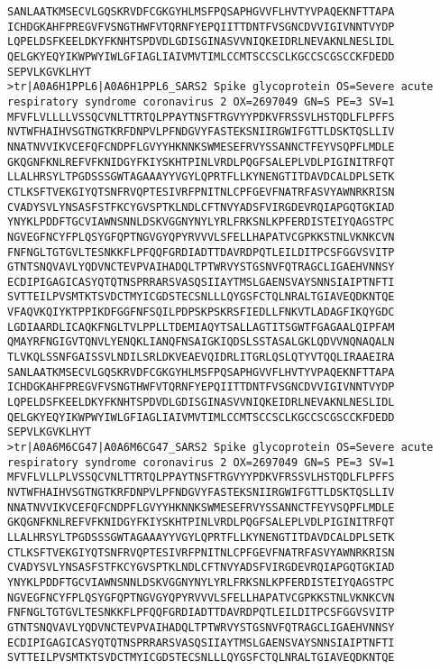 \begin{lstlisting}
SANLAATKMSECVLGQSKRVDFCGKGYHLMSFPQSAPHGVVFLHVTYVPAQEKNFTTAPA
ICHDGKAHFPREGVFVSNGTHWFVTQRNFYEPQIITTDNTFVSGNCDVVIGIVNNTVYDP
LQPELDSFKEELDKYFKNHTSPDVDLGDISGINASVVNIQKEIDRLNEVAKNLNESLIDL
QELGKYEQYIKWPWYIWLGFIAGLIAIVMVTIMLCCMTSCCSCLKGCCSCGSCCKFDEDD
SEPVLKGVKLHYT
>tr|A0A6H1PPL6|A0A6H1PPL6_SARS2 Spike glycoprotein OS=Severe acute respiratory syndrome coronavirus 2 OX=2697049 GN=S PE=3 SV=1
MFVFLVLLLLVSSQCVNLTTRTQLPPAYTNSFTRGVYYPDKVFRSSVLHSTQDLFLPFFS
NVTWFHAIHVSGTNGTKRFDNPVLPFNDGVYFASTEKSNIIRGWIFGTTLDSKTQSLLIV
NNATNVVIKVCEFQFCNDPFLGVYYHKNNKSWMESEFRVYSSANNCTFEYVSQPFLMDLE
GKQGNFKNLREFVFKNIDGYFKIYSKHTPINLVRDLPQGFSALEPLVDLPIGINITRFQT
LLALHRSYLTPGDSSSGWTAGAAAYYVGYLQPRTFLLKYNENGTITDAVDCALDPLSETK
CTLKSFTVEKGIYQTSNFRVQPTESIVRFPNITNLCPFGEVFNATRFASVYAWNRKRISN
CVADYSVLYNSASFSTFKCYGVSPTKLNDLCFTNVYADSFVIRGDEVRQIAPGQTGKIAD
YNYKLPDDFTGCVIAWNSNNLDSKVGGNYNYLYRLFRKSNLKPFERDISTEIYQAGSTPC
NGVEGFNCYFPLQSYGFQPTNGVGYQPYRVVVLSFELLHAPATVCGPKKSTNLVKNKCVN
FNFNGLTGTGVLTESNKKFLPFQQFGRDIADTTDAVRDPQTLEILDITPCSFGGVSVITP
GTNTSNQVAVLYQDVNCTEVPVAIHADQLTPTWRVYSTGSNVFQTRAGCLIGAEHVNNSY
ECDIPIGAGICASYQTQTNSPRRARSVASQSIIAYTMSLGAENSVAYSNNSIAIPTNFTI
SVTTEILPVSMTKTSVDCTMYICGDSTECSNLLLQYGSFCTQLNRALTGIAVEQDKNTQE
VFAQVKQIYKTPPIKDFGGFNFSQILPDPSKPSKRSFIEDLLFNKVTLADAGFIKQYGDC
LGDIAARDLICAQKFNGLTVLPPLLTDEMIAQYTSALLAGTITSGWTFGAGAALQIPFAM
QMAYRFNGIGVTQNVLYENQKLIANQFNSAIGKIQDSLSSTASALGKLQDVVNQNAQALN
TLVKQLSSNFGAISSVLNDILSRLDKVEAEVQIDRLITGRLQSLQTYVTQQLIRAAEIRA
SANLAATKMSECVLGQSKRVDFCGKGYHLMSFPQSAPHGVVFLHVTYVPAQEKNFTTAPA
ICHDGKAHFPREGVFVSNGTHWFVTQRNFYEPQIITTDNTFVSGNCDVVIGIVNNTVYDP
LQPELDSFKEELDKYFKNHTSPDVDLGDISGINASVVNIQKEIDRLNEVAKNLNESLIDL
QELGKYEQYIKWPWYIWLGFIAGLIAIVMVTIMLCCMTSCCSCLKGCCSCGSCCKFDEDD
SEPVLKGVKLHYT
>tr|A0A6M6CG47|A0A6M6CG47_SARS2 Spike glycoprotein OS=Severe acute respiratory syndrome coronavirus 2 OX=2697049 GN=S PE=3 SV=1
MFVFLVLLPLVSSQCVNLTTRTQLPPAYTNSFTRGVYYPDKVFRSSVLHSTQDLFLPFFS
NVTWFHAIHVSGTNGTKRFDNPVLPFNDGVYFASTEKSNIIRGWIFGTTLDSKTQSLLIV
NNATNVVIKVCEFQFCNDPFLGVYYHKNNKSWMESEFRVYSSANNCTFEYVSQPFLMDLE
GKQGNFKNLREFVFKNIDGYFKIYSKHTPINLVRDLPQGFSALEPLVDLPIGINITRFQT
LLALHRSYLTPGDSSSGWTAGAAAYYVGYLQPRTFLLKYNENGTITDAVDCALDPLSETK
CTLKSFTVEKGIYQTSNFRVQPTESIVRFPNITNLCPFGEVFNATRFASVYAWNRKRISN
CVADYSVLYNSASFSTFKCYGVSPTKLNDLCFTNVYADSFVIRGDEVRQIAPGQTGKIAD
YNYKLPDDFTGCVIAWNSNNLDSKVGGNYNYLYRLFRKSNLKPFERDISTEIYQAGSTPC
NGVEGFNCYFPLQSYGFQPTNGVGYQPYRVVVLSFELLHAPATVCGPKKSTNLVKNKCVN
FNFNGLTGTGVLTESNKKFLPFQQFGRDIADTTDAVRDPQTLEILDITPCSFGGVSVITP
GTNTSNQVAVLYQDVNCTEVPVAIHADQLTPTWRVYSTGSNVFQTRAGCLIGAEHVNNSY
ECDIPIGAGICASYQTQTNSPRRARSVASQSIIAYTMSLGAENSVAYSNNSIAIPTNFTI
SVTTEILPVSMTKTSVDCTMYICGDSTECSNLLLQYGSFCTQLNRALTGIAVEQDKNTQE

\end{lstlisting}
